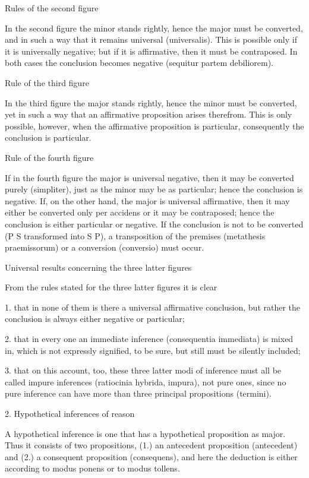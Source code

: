 Rules of the second figure

In the second figure the minor stands rightly,
hence the major must be converted,
and in such a way that it remains universal (universalis).
This is possible only if it is universally negative;
but if it is affirmative, then it must be contraposed.
In both cases the conclusion becomes negative
(sequitur partem debiliorem).

Rule of the third figure

In the third figure the major stands rightly,
hence the minor must be converted,
yet in such a way that an affirmative proposition arises therefrom.
This is only possible, however,
when the affirmative proposition is particular,
consequently the conclusion is particular.

Rule of the fourth figure

If in the fourth figure the major is universal negative,
then it may be converted purely (simpliter),
just as the minor may be as particular;
hence the conclusion is negative.
If, on the other hand, the major is universal affirmative,
then it may either be converted only per accidens
or it may be contraposed;
hence the conclusion is either particular or negative.
If the conclusion is not to be converted
(P S transformed into S P),
a transposition of the premises (metathesis praemissorum)
or a conversion (conversio) must occur.

Universal results concerning the three latter figures

From the rules stated for the three latter figures it is clear

1.  that in none of them is there a universal affirmative conclusion,
    but rather the conclusion is always either negative or particular;

2.  that in every one an immediate inference
    (consequentia immediata) is mixed in,
    which is not expressly signified, to be sure,
    but still must be silently included;

3.  that on this account, too, these three latter modi of inference
    must all be called impure inferences (ratiocinia hybrida, impura),
    not pure ones, since no pure inference can have more than
    three principal propositions (termini).

2. Hypothetical inferences of reason

A hypothetical inference is one
that has a hypothetical proposition as major.
Thus it consists of two propositions,
(1.) an antecedent proposition (antecedent) and
(2.) a consequent proposition (consequens), and
here the deduction is either according to modus ponens or to modus tollens.

